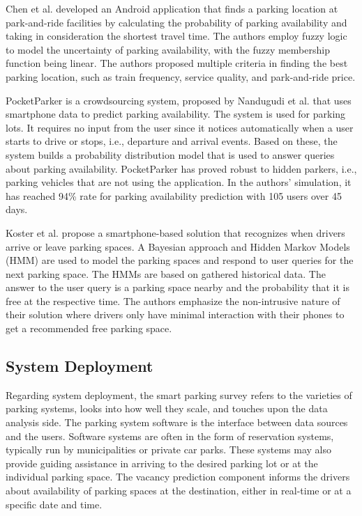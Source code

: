 	Chen et al.\cite{zchen} developed an Android application that finds a parking location at park-and-ride facilities by calculating the probability of parking availability and taking in consideration the shortest travel time. The authors employ fuzzy logic to model the uncertainty of parking availability, with the fuzzy membership function being linear. The authors proposed multiple criteria in finding the best parking location, such as train frequency, service quality, and park-and-ride price. 
	
	PocketParker is a crowdsourcing system, proposed by Nandugudi et al.\cite{nandugudi} that uses smartphone data to predict parking availability. The system is used for parking lots. It requires no input from the user since it notices automatically when a user starts to drive or stops, i.e., departure and arrival events. Based on these, the system builds a probability distribution model that is used to answer queries about parking availability. PocketParker has proved robust to hidden parkers, i.e., parking vehicles that are not using the application. In the authors' simulation, it has reached 94\% rate for parking availability prediction with 105 users over 45 days. 
	
	Koster et al.\cite{koster} propose a smartphone-based solution that recognizes when drivers arrive or leave parking spaces. A Bayesian approach and Hidden Markov Models (HMM) are used to model the parking spaces and respond to user queries for the next parking space. The HMMs are based on gathered historical data. The answer to the user query is a parking space nearby and the probability that it is free at the respective time. The authors emphasize the non-intrusive nature of their solution where drivers only have minimal interaction with their phones to get a recommended free parking space.
	
	\subsection{System Deployment}
	Regarding system deployment, the smart parking survey\cite{lin} refers to the varieties of parking systems, looks into how well they scale, and touches upon the data analysis side. The parking system software is the interface between data sources and the users. Software systems are often in the form of reservation systems, typically run by municipalities or private car parks. These systems may also provide guiding assistance in arriving to the desired parking lot or at the individual parking space. The vacancy prediction component informs the drivers about availability of parking spaces at the destination, either in real-time or at a specific date and time.
	
